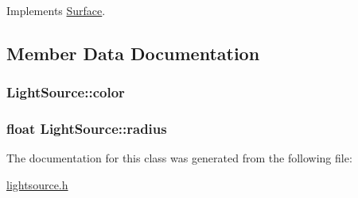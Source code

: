 Implements \hyperlink{classSurface_ab1ee990da290748cd86aaf95edb28c38}{Surface}.



\subsection{Member Data Documentation}
\subsubsection[{\texorpdfstring{color}{color}}]{ Light\+Source\+::color}\hypertarget{classLightSource_a4a567c627c51e5850af199a8af6bea27}{}\label{classLightSource_a4a567c627c51e5850af199a8af6bea27}
\subsubsection[{\texorpdfstring{radius}{radius}}]{\setlength{\rightskip}{0pt plus 5cm}float Light\+Source\+::radius}\hypertarget{classLightSource_a6dbf2113c6dac64e323ebf4f691d1e66}{}\label{classLightSource_a6dbf2113c6dac64e323ebf4f691d1e66}


The documentation for this class was generated from the following file\+:\begin{DoxyCompactItemize}
\item 
\hyperlink{lightsource_8h}{lightsource.\+h}\end{DoxyCompactItemize}
